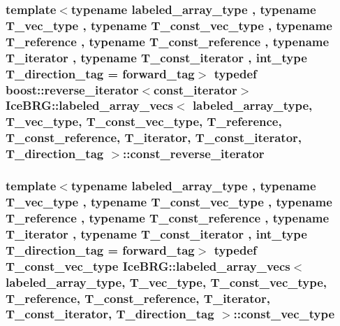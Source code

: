 \subsubsection[{const\+\_\+reverse\+\_\+iterator}]{\setlength{\rightskip}{0pt plus 5cm}template$<$typename labeled\+\_\+array\+\_\+type , typename T\+\_\+vec\+\_\+type , typename T\+\_\+const\+\_\+vec\+\_\+type , typename T\+\_\+reference , typename T\+\_\+const\+\_\+reference , typename T\+\_\+iterator , typename T\+\_\+const\+\_\+iterator , int\+\_\+type T\+\_\+direction\+\_\+tag = forward\+\_\+tag$>$ typedef boost\+::reverse\+\_\+iterator$<${\bf const\+\_\+iterator}$>$ {\bf Ice\+B\+R\+G\+::labeled\+\_\+array\+\_\+vecs}$<$ labeled\+\_\+array\+\_\+type, T\+\_\+vec\+\_\+type, T\+\_\+const\+\_\+vec\+\_\+type, T\+\_\+reference, T\+\_\+const\+\_\+reference, T\+\_\+iterator, T\+\_\+const\+\_\+iterator, T\+\_\+direction\+\_\+tag $>$\+::{\bf const\+\_\+reverse\+\_\+iterator}}\label{classIceBRG_1_1labeled__array__vecs_aefecf82bcd5d24b2c6fc29b4f8930054}
\hypertarget{classIceBRG_1_1labeled__array__vecs_a02abd04f15383823d790ea596eee00ed}{}
\subsubsection[{const\+\_\+vec\+\_\+type}]{\setlength{\rightskip}{0pt plus 5cm}template$<$typename labeled\+\_\+array\+\_\+type , typename T\+\_\+vec\+\_\+type , typename T\+\_\+const\+\_\+vec\+\_\+type , typename T\+\_\+reference , typename T\+\_\+const\+\_\+reference , typename T\+\_\+iterator , typename T\+\_\+const\+\_\+iterator , int\+\_\+type T\+\_\+direction\+\_\+tag = forward\+\_\+tag$>$ typedef T\+\_\+const\+\_\+vec\+\_\+type {\bf Ice\+B\+R\+G\+::labeled\+\_\+array\+\_\+vecs}$<$ labeled\+\_\+array\+\_\+type, T\+\_\+vec\+\_\+type, T\+\_\+const\+\_\+vec\+\_\+type, T\+\_\+reference, T\+\_\+const\+\_\+reference, T\+\_\+iterator, T\+\_\+const\+\_\+iterator, T\+\_\+direction\+\_\+tag $>$\+::{\bf const\+\_\+vec\+\_\+type}}\label{classIceBRG_1_1labeled__array__vecs_a02abd04f15383823d790ea596eee00ed}
\hypertarget{classIceBRG_1_1labeled__array__vecs_ab3914361470feba7994ebc0f84ea683b}{}
